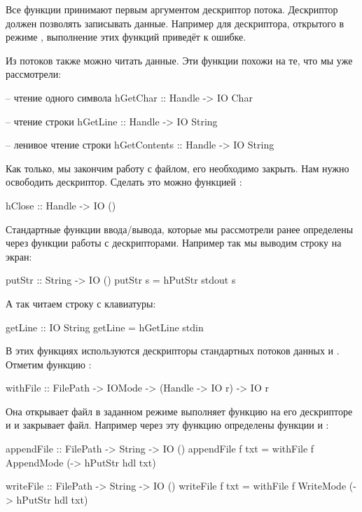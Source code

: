 Все функции принимают первым аргументом дескриптор потока. Дескриптор
должен позволять записывать данные. Например для дескриптора, открытого
в режиме , выполнение этих функций приведёт к ошибке.

Из потоков также можно читать данные. Эти функции похожи на те, что мы
уже рассмотрели:


\begin{code}
-- чтение одного символа
hGetChar :: Handle -> IO Char

-- чтение строки
hGetLine :: Handle -> IO String

-- ленивое чтение строки
hGetContents :: Handle -> IO String
\end{code}

Как только, мы закончим работу с файлом, его необходимо закрыть. Нам
нужно освободить дескриптор. Сделать это можно функцией :


\begin{code}
hClose :: Handle -> IO ()
\end{code}

Стандартные функции ввода/вывода, которые мы рассмотрели ранее
определены через функции работы с дескрипторами. Например так мы выводим
строку на экран:


\begin{code}
putStr          :: String -> IO ()
putStr s        =  hPutStr stdout s
\end{code}

А так читаем строку с клавиатуры:


\begin{code}
getLine         :: IO String
getLine         =  hGetLine stdin
\end{code}

В этих функциях используются дескрипторы стандартных потоков данных
 и . Отметим функцию :


\begin{code}
withFile :: FilePath -> IOMode -> (Handle -> IO r) -> IO r
\end{code}

Она открывает файл в заданном режиме выполняет функцию на его
дескрипторе и и закрывает файл. Например через эту функцию определены
функции  и :


\begin{code}
appendFile      :: FilePath -> String -> IO ()
appendFile f txt = withFile f AppendMode (\hdl -> hPutStr hdl txt)

writeFile :: FilePath -> String -> IO ()
writeFile f txt = withFile f WriteMode (\hdl -> hPutStr hdl txt)
\end{code}


